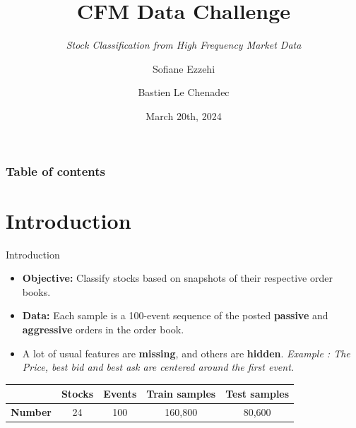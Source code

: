 \documentclass{beamer}
\title{CFM Data Challenge}
\subtitle{\textit{Stock Classification from High Frequency Market Data}}
\author{Sofiane Ezzehi \and Bastien Le Chenadec}
\institute[MVA]{École Normale Supérieure Paris-Saclay, Master MVA}
\date{March 20th, 2024}
\begin{document}
\frame[plain]{\titlepage}

\begin{frame}
    \frametitle{Table of contents}
    \small\tableofcontents[subsectionstyle=hide]
\end{frame}

\section{Introduction}
\begin{frame}{Introduction}
    \begin{itemize}
        \item \textbf{Objective:} Classify stocks based on snapshots of their respective order books.
        \item \textbf{Data:} Each sample is a 100-event sequence of the posted \textbf{passive} and \textbf{aggressive} orders in the order book.
        \item A lot of usual features are \textbf{missing}, and others are \textbf{hidden}. \textit{Example : The Price, best bid and best ask are centered around the first event.}
    \end{itemize}

    \begin{table}[H]
        \begin{center}
            \begin{tabular}{|c|c|c|c|c|}
                \hline
                \textbf{}       & \textbf{Stocks} & \textbf{Events} & \textbf{Train samples} & \textbf{Test samples} \\
                \hline
                \textbf{Number} & 24              & 100             & 160,800                & 80,600                \\
                \hline
            \end{tabular}
        \end{center}
    \end{table}

\end{frame}
\end{document}
